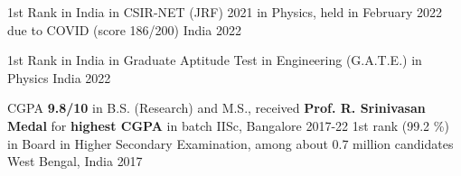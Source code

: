 




\begin{cvhonors}


 \cvhonor
{1st Rank in India} %
{in CSIR-NET (JRF) 2021 in Physics, held in February 2022 due to COVID (score 186/200)} %
{India} %
{2022} %

 \cvhonor
{1st Rank in India} %
{in Graduate Aptitude Test in Engineering (G.A.T.E.) in Physics} %
{India} %
{2022} %

  \cvhonor
{} %
{CGPA \textbf{\color[HTML]{414141} 9.8/10} in B.S. (Research) and M.S., received \textbf{\color[HTML]{414141} Prof. R. Srinivasan Medal} for \textbf{\color[HTML]{414141} highest CGPA} in batch} %
{IISc, Bangalore} %
{2017-22} %
  \cvhonor
    {1st rank (99.2 \%) in Board} %
    {in Higher Secondary Examination, among about 0.7 million candidates} %
    {West Bengal, India} %
    {2017} %


	 


\end{cvhonors}
